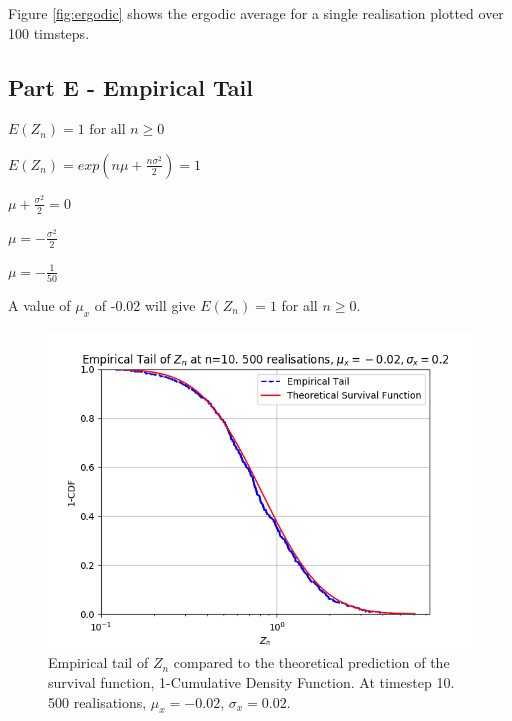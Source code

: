 \documentclass{article}
\begin{document}
Figure \ref{fig:ergodic} shows the ergodic average for a single realisation plotted over 100 timsteps. 

\subsection{Part E - Empirical Tail}

$E(Z_n) = 1 \text{ for all } n\geq0$

$E(Z_n) = exp(n\mu + \frac{n\sigma^2}{2}) = 1$

$\mu + \frac{\sigma^2}{2} = 0$

$\mu = - \frac{\sigma^2}{2}$

$\mu = -\frac{1}{50}$

A value of $\mu_x$ of -0.02 will give $E(Z_n)=1$ for all $n \geq 0$.

\begin{figure}[H]
\includegraphics[scale=0.8]{empirical_tail_10_a.png} 
\caption{Empirical tail of $Z_n$ compared to the theoretical prediction of the survival function, 1-Cumulative Density Function. At timestep 10. 500 realisations, $\mu_x=-0.02$, $\sigma_x=0.02$.}
\label{fig:tail_10}
\end{figure}
\end{document}
